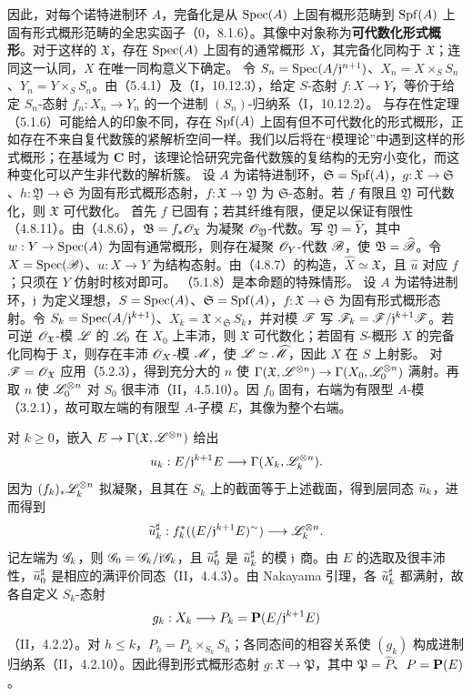 因此，对每个诺特进制环 $A$，完备化是从 $\operatorname{Spec}(A)$ 上固有概形范畴到 $\operatorname{Spf}(A)$ 上固有形式概形范畴的全忠实函子（0，8.1.6）。其像中对象称为\textbf{可代数化形式概形}。对于这样的 $\mathfrak X$，存在 $\operatorname{Spec}(A)$ 上固有的通常概形 $X$，其完备化同构于 $\mathfrak X$；连同这一认同，$X$ 在唯一同构意义下确定。
令 $S_n=\operatorname{Spec}(A/\mathfrak j^{n+1})$、$X_n=X\times_SS_n$、$Y_n=Y\times_SS_n$。由（5.4.1）及（I，10.12.3），给定 $S$-态射 $f:X\to Y$，等价于给定 $S_n$-态射 $f_n:X_n\to Y_n$ 的一个进制 $(S_n)$-归纳系（I，10.12.2）。
与存在性定理（5.1.6）可能给人的印象不同，存在 $\operatorname{Spf}(A)$ 上固有但不可代数化的形式概形，正如存在不来自复代数簇的紧解析空间一样。我们以后将在“模理论”中遇到这样的形式概形；在基域为 $\mathbf C$ 时，该理论恰研究完备代数簇的复结构的无穷小变化，而这种变化可以产生非代数的解析簇。
设 $A$ 为诺特进制环，$\mathfrak S=\operatorname{Spf}(A)$，$g:\mathfrak X\to\mathfrak S$、$h:\mathfrak Y\to\mathfrak S$ 为固有形式概形态射，$f:\mathfrak X\to\mathfrak Y$ 为 $\mathfrak S$-态射。若 $f$ 有限且 $\mathfrak Y$ 可代数化，则 $\mathfrak X$ 可代数化。
\eproof
首先 $f$ 已固有；若其纤维有限，便足以保证有限性（4.8.11）。由（4.8.6），$\mathfrak B=f_*\mathscr O_{\mathfrak X}$ 为凝聚 $\mathscr O_{\mathfrak Y}$-代数。写 $\mathfrak Y=\widehat Y$，其中 $w:Y\to\operatorname{Spec}(A)$ 为固有通常概形，则存在凝聚 $\mathscr O_Y$-代数 $\mathscr B$，使 $\mathfrak B=\widehat{\mathscr B}$。令 $X=\operatorname{Spec}(\mathscr B)$、$u:X\to Y$ 为结构态射。由（4.8.7）的构造，$\widehat X\simeq\mathfrak X$，且 $\widehat u$ 对应 $f$；只须在 $Y$ 仿射时核对即可。\finishproof
（5.1.8）是本命题的特殊情形。
设 $A$ 为诺特进制环，$\mathfrak j$ 为定义理想，$S=\operatorname{Spec}(A)$、$\mathfrak S=\operatorname{Spf}(A)$，$f:\mathfrak X\to\mathfrak S$ 为固有形式概形态射。令 $S_k=\operatorname{Spec}(A/\mathfrak j^{k+1})$、$X_k=\mathfrak X\times_{\mathfrak S}S_k$，并对模 $\mathscr F$ 写 $\mathscr F_k=\mathscr F/\mathfrak j^{k+1}\mathscr F$。若可逆 $\mathscr O_{\mathfrak X}$-模 $\mathscr L$ 的 $\mathscr L_0$ 在 $X_0$ 上丰沛，则 $\mathfrak X$ 可代数化；若固有 $S$-概形 $X$ 的完备化同构于 $\mathfrak X$，则存在丰沛 $\mathscr O_X$-模 $\mathscr M$，使 $\mathscr L\simeq\widehat{\mathscr M}$，因此 $X$ 在 $S$ 上射影。
\eproof
对 $\mathscr F=\mathscr O_{\mathfrak X}$ 应用（5.2.3），得到充分大的 $n$ 使 $\Gamma(\mathfrak X,\mathscr L^{\otimes n})\to\Gamma(X_0,\mathscr L_0^{\otimes n})$ 满射。再取 $n$ 使 $\mathscr L_0^{\otimes n}$ 对 $S_0$ 很丰沛（II，4.5.10）。因 $f_0$ 固有，右端为有限型 $A$-模（3.2.1），故可取左端的有限型 $A$-子模 $E$，其像为整个右端。

对 $k\ge0$，嵌入 $E\to\Gamma(\mathfrak X,\mathscr L^{\otimes n})$ 给出
\[
u_k:E/\mathfrak j^{k+1}E\longrightarrow\Gamma(X_k,\mathscr L_k^{\otimes n}).
\]
因为 $(f_k)_*\mathscr L_k^{\otimes n}$ 拟凝聚，且其在 $S_k$ 上的截面等于上述截面，得到层同态 $\widetilde{u}_k$，进而得到
\[
\widetilde{u}_k^\sharp:f_k^*((E/\mathfrak j^{k+1}E)^\sim)\longrightarrow\mathscr L_k^{\otimes n}.
\]
记左端为 $\mathscr G_k$，则 $\mathscr G_0=\mathscr G_k/\mathfrak j\mathscr G_k$，且 $\widetilde{u}_0^\sharp$ 是 $\widetilde{u}_k^\sharp$ 的模 $\mathfrak j$ 商。由 $E$ 的选取及很丰沛性，$\widetilde{u}_0^\sharp$ 是相应的满评价同态（II，4.4.3）。由 Nakayama 引理，各 $\widetilde{u}_k^\sharp$ 都满射，故各自定义 $S_k$-态射
\[
g_k:X_k\longrightarrow P_k=\mathbf P(E/\mathfrak j^{k+1}E)
\]
（II，4.2.2）。对 $h\le k$，$P_h=P_k\times_{S_k}S_h$；各同态间的相容关系使 $(g_k)$ 构成进制归纳系（II，4.2.10）。因此得到形式概形态射 $g:\mathfrak X\to\mathfrak P$，其中 $\mathfrak P=\widehat P$、$P=\mathbf P(E)$。

